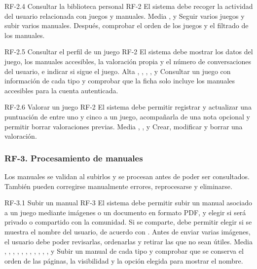 \requisitoFuncional
{RF-2.4}
{Consultar la biblioteca personal}
{}
{RF-2}
{El sistema debe recoger la actividad del usuario relacionada con juegos y
manuales.
}
{Media}
{,  y }
{Seguir varios juegos y subir varios manuales. Después, comprobar el orden de
los juegos y el filtrado de los manuales.}

\requisitoFuncional
{RF-2.5}
{Consultar el perfil de un juego}
{}
{RF-2}
{El sistema debe mostrar los datos del juego, los manuales accesibles, la
valoración propia y el número de conversaciones del usuario, e indicar si sigue el juego.}
{Alta}
{, , ,
,  y }
{Consultar un juego con información de cada tipo y comprobar que la ficha
solo incluye los manuales accesibles para la cuenta autenticada.}

\requisitoFuncional
{RF-2.6}
{Valorar un juego}
{}
{RF-2}
{El sistema debe permitir registrar y actualizar una puntuación de entre
uno y cinco a un juego, acompañarla de una nota opcional y permitir
borrar valoraciones previas.}
{Media}
{, ,  y
}
{Crear, modificar y borrar una valoración.}

\subsubsection{RF-3. Procesamiento de manuales}

Los manuales se validan al subirlos y se procesan antes de poder ser
consultados.
También pueden corregirse manualmente errores, reprocesarse y eliminarse.

\requisitoFuncional
{RF-3.1}
{Subir un manual}
{}
{RF-3}
{El sistema debe permitir subir un manual asociado a un juego mediante
imágenes o un documento en formato \acs{PDF}, y elegir si será
privado o compartido con la comunidad. Si se comparte, debe permitir elegir
si se muestra el nombre del usuario, de acuerdo con .
Antes de enviar varias imágenes, el usuario debe poder revisarlas, ordenarlas y retirar las que no sean útiles.}
{Media}
{, , ,
, , ,
, , ,
, ,  y
}
{Subir un manual de cada tipo y comprobar que se
conserva el orden de las páginas, la visibilidad y la opción elegida para
mostrar el nombre.}

